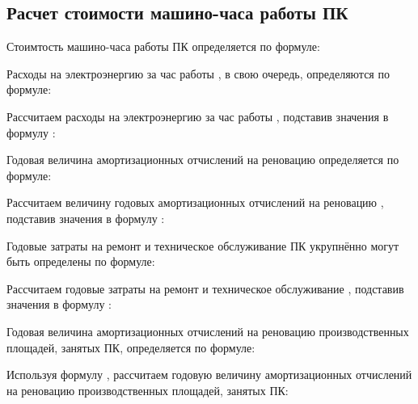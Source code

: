 \subsection{Расчет стоимости машино-часа работы ПК}
\label{sec:economics:cpuclocktime}

Стоимтость машино-часа работы ПК определяется по формуле:
\pcHourCostEquation

Расходы на электроэнергию за час работы \pc, в свою очередь, определяются по формуле:
\energyHourCostEquation

Рассчитаем расходы на электроэнергию за час работы \pc, подставив значения в формулу :
\energyHourCostFormulaApplied

Годовая величина амортизационных отчислений на реновацию \pc определяется по формуле:
\pcAmortizationCostEquation

Рассчитаем величину годовых амортизационных отчислений на реновацию \pc, подставив значения в формулу :
\pcAmortizationCostFormulaApplied

Годовые затраты на ремонт и техническое обслуживание ПК укрупнённо могут быть определены по формуле:
\pcSupportCostEquation

Рассчитаем годовые затраты на ремонт и техническое обслуживание \pc, подставив значения в формулу :
\pcSupportCostFormulaApplied

Годовая величина амортизационных отчислений на реновацию производственных площадей, занятых ПК, определяется по формуле:
\devPlaceAmortizationCostEquation

Используя формулу , рассчитаем годовую величину амортизационных отчислений на реновацию производственных площадей, занятых ПК:
\devPlaceAmortizationCostFormulaApplied